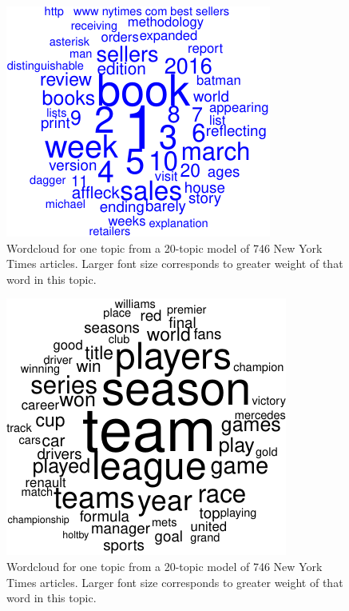\documentclass[12pt,]{article}
\begin{document}
\begin{figure}
\includegraphics[width=\textwidth]{lda-tutorial-2016_files/figure-latex/wordcloud1-3.pdf}
\caption{Wordcloud for one topic from a 20-topic model of 746 New York Times articles. Larger font size corresponds to greater weight of that word in this topic.\label{fig:wc3}}
\end{figure}

\begin{figure}
\includegraphics[width=\textwidth]{lda-tutorial-2016_files/figure-latex/wordcloud1-4.pdf}
\caption{Wordcloud for one topic from a 20-topic model of 746 New York Times articles. Larger font size corresponds to greater weight of that word in this topic.\label{fig:wc4}}
\end{figure}
\end{document}
